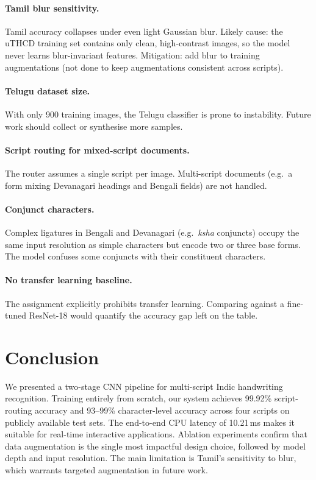 \documentclass[10pt,twocolumn]{article}
\begin{document}
\paragraph{Tamil blur sensitivity.}
Tamil accuracy collapses under even light Gaussian blur.  Likely cause: the
uTHCD training set contains only clean, high-contrast images, so the model
never learns blur-invariant features.  Mitigation: add blur to training
augmentations (not done to keep augmentations consistent across scripts).

\paragraph{Telugu dataset size.}
With only 900 training images, the Telugu classifier is prone to instability.
Future work should collect or synthesise more samples.

\paragraph{Script routing for mixed-script documents.}
The router assumes a single script per image.  Multi-script documents (e.g.\
a form mixing Devanagari headings and Bengali fields) are not handled.

\paragraph{Conjunct characters.}
Complex ligatures in Bengali and Devanagari (e.g.\ \textit{ksha} conjuncts)
occupy the same input resolution as simple characters but encode two or three
base forms.  The model confuses some conjuncts with their constituent
characters.

\paragraph{No transfer learning baseline.}
The assignment explicitly prohibits transfer learning.  Comparing against a
fine-tuned ResNet-18 would quantify the accuracy gap left on the table.

\section{Conclusion}

We presented a two-stage CNN pipeline for multi-script Indic handwriting
recognition.  Training entirely from scratch, our system achieves 99.92\%
script-routing accuracy and 93--99\% character-level accuracy across four
scripts on publicly available test sets.  The end-to-end CPU latency of
10.21\,ms makes it suitable for real-time interactive applications.
Ablation experiments confirm that data augmentation is the single most
impactful design choice, followed by model depth and input resolution.
The main limitation is Tamil's sensitivity to blur, which warrants targeted
augmentation in future work.
\end{document}
